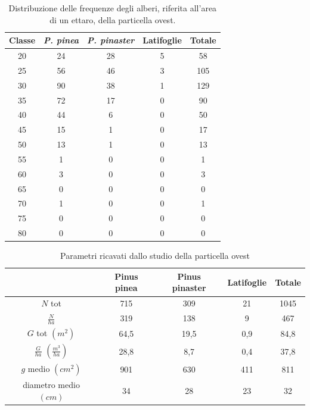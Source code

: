 \begin{table}[H]
\caption{Distribuzione delle frequenze degli alberi, riferita all'area di un ettaro, della particella ovest.}
\centering
\begin{tabular}{ccccc}
\toprule
Classe & \textit{P. pinea} & \textit{P. pinaster} & Latifoglie & Totale \\
\midrule
20     & 24                & 28                   & 5          & 58     \\
25     & 56                & 46                   & 3          & 105    \\
30     & 90                & 38                   & 1          & 129    \\
35     & 72                & 17                   & 0          & 90     \\
40     & 44                & 6                    & 0          & 50     \\
45     & 15                & 1                    & 0          & 17     \\
50     & 13                & 1                    & 0          & 13     \\
55     & 1                 & 0                    & 0          & 1      \\
60     & 3                 & 0                    & 0          & 3      \\
65     & 0                 & 0                    & 0          & 0      \\
70     & 1                 & 0                    & 0          & 1      \\
75     & 0                 & 0                    & 0          & 0      \\
80     & 0                 & 0                    & 0          & 0     \\
\bottomrule
\end{tabular}
\label{tab:tab_freq_cav_ovest}
\end{table}

\begin{table}[H]
  \caption{Parametri ricavati dallo studio della particella ovest}
    \centering
    \begin{tabular}{ccccc}
     \toprule
       & Pinus pinea & Pinus pinaster &  Latifoglie & Totale  \\
       \midrule
        $N$ tot & 715 & 309 & 21 & 1045\\
        $\frac{N}{ha}$ & 319 & 138 & 9 & 467\\
        $G$  tot $(m^2)$ & 64,5 & 19,5 & 0,9 & 84,8\\
        $\frac{G}{ha}$ $(\frac{m^3}{ha})$ & 28,8 & 8,7 & 0,4 & 37,8\\
        $g$ medio $(cm^2)$ & 901 & 630 & 411 & 811\\
        diametro medio $(cm)$ & 34 & 28 & 23 & 32\\
       \bottomrule
        \end{tabular}
    \label{tab:tab_cav_ovest}
\end{table}


